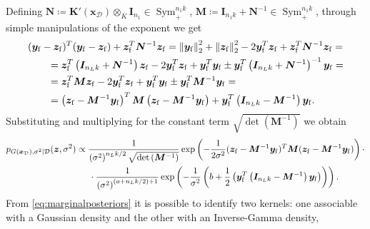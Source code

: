 \documentclass[a4paper, 11pt, reqno]{amsart}
\theoremstyle{plain}
\theoremstyle{remark}
\theoremstyle{definition}
\newcommand{\norm}[1]{\left\lVert#1\right\rVert}
\renewcommand{\exp}[1]{\operatorname{exp}\left(#1\right)}
\renewcommand{\det}[1]{\operatorname{det}\left(#1\right)}
\newcommand{\blankeq}{\kern14.65pt}
\newcommand{\train}{\mathcal{D}}
\begin{document}
Defining $\bm{N} \coloneqq \bm{K}'(\bm{x}_{\mathcal{D}}) \otimes_K \bm{I}_{n_1} \in \operatorname{Sym}_+^{n_1 k}$, $\bm{M} \coloneqq \bm{I}_{n_1 k} + \bm{N}^{-1} \in \operatorname{Sym}_+^{n_1 k}$, through simple manipulations of the exponent we get
\begin{equation*}
	\begin{aligned}
		& (\bm{y}_{\mathrm{f}} - \bm{z}_{\mathrm{f}})^T (\bm{y}_{\mathrm{f}} - \bm{z}_{\mathrm{f}}) + \bm{z}_{\mathrm{f}}^T \bm{N}^{-1} \bm{z}_{\mathrm{f}} = 
		\norm{\bm{y}_{\mathrm{f}}}_2^2 + \norm{\bm{z}_{\mathrm{f}}}_2^2 - 2 \bm{y}_{\mathrm{f}}^T \bm{z}_{\mathrm{f}} + \bm{z}_{\mathrm{f}}^T \bm{N}^{-1} \bm{z}_{\mathrm{f}} = \\
		& \kern20pt = \bm{z}_{\mathrm{f}}^T \left(\bm{I}_{n_L k} + \bm{N}^{-1}\right) \bm{z}_{\mathrm{f}} - 2 \bm{y}_{\mathrm{f}}^T \bm{z}_{\mathrm{f}} + \bm{y}_{\mathrm{f}}^T \bm{y}_{\mathrm{f}} \pm \bm{y}_{\mathrm{f}}^T \left(\bm{I}_{n_L k} + \bm{N}^{-1}\right)^{-1} \bm{y}_{\mathrm{f}} = \\
		& \kern20pt = \bm{z}_{\mathrm{f}}^T \bm{M} \bm{z}_{\mathrm{f}} - 2 \bm{y}_{\mathrm{f}}^T \bm{z}_{\mathrm{f}} + \bm{y}_{\mathrm{f}}^T \bm{y}_{\mathrm{f}} \pm \bm{y}_{\mathrm{f}}^T \bm{M}^{-1} \bm{y}_{\mathrm{f}} = \\
		& \kern20pt = \left(\bm{z}_{\mathrm{f}} - \bm{M}^{-1} \bm{y}_{\mathrm{f}}\right)^T \bm{M} \left(\bm{z}_{\mathrm{f}} - \bm{M}^{-1} \bm{y}_{\mathrm{f}}\right) + \bm{y}_{\mathrm{f}}^T \left(\bm{I}_{n_L k} - \bm{M}^{-1}\right) \bm{y}_{\mathrm{f}}.
	\end{aligned}
\end{equation*}
Substituting and multiplying for the constant term $\sqrt{\det{\bm{M}^{-1}}}$ we obtain
\begin{equation} \label{eq:marginalposteriors}
	\begin{aligned}
		p_{G(\bm{x}_{\mathcal{D}}), \sigma^2 | \train}(\bm{z}, \sigma^2) & \propto \frac{1}{\left(\sigma^2\right)^{n_L k / 2} \sqrt{\det{\bm{M}^{-1}}}} \exp{-\frac{1}{2 \sigma^2} (\bm{z}_{\mathrm{f}} - \bm{M}^{-1} \bm{y}_{\mathrm{f}})^T \bm{M} (\bm{z}_{\mathrm{f}} - \bm{M}^{-1} \bm{y}_{\mathrm{f}})} \cdot \\
		& \blankeq \cdot \frac{1}{\left(\sigma^2\right)^{(a + n_L k / 2) + 1}} \exp{-\frac{1}{\sigma^2} \left(b + \frac{1}{2} \left(\bm{y}_{\mathrm{f}}^T \left(\bm{I}_{n_L k} - \bm{M}^{-1}\right) \bm{y}_{\mathrm{f}}\right)\right)}.
	\end{aligned}
\end{equation}
From \cref{eq:marginalposteriors} it is possible to identify two kernels: one associable with a Gaussian density and the other with an Inverse-Gamma density,
\end{document}
